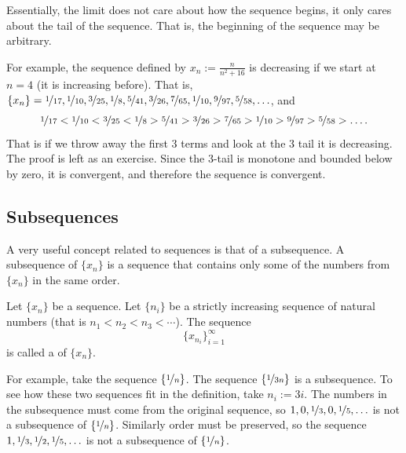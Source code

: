 \documentclass[12pt]{book}
\begin{document}
Essentially, the limit does not care about how the sequence begins, it only
cares about the tail of the sequence.
That is, the beginning of the sequence
may be arbitrary.

For example, the sequence defined by $x_n := \frac{n}{n^2+16}$ is decreasing
if we start at $n=4$ (it is increasing before).
That is,
$\{ x_n \} =
\nicefrac{1}{17},
\nicefrac{1}{10},
\nicefrac{3}{25},
\nicefrac{1}{8},
\nicefrac{5}{41},
\nicefrac{3}{26},
\nicefrac{7}{65},
\nicefrac{1}{10},
\nicefrac{9}{97},
\nicefrac{5}{58},\ldots$, and 
\begin{equation*}
\nicefrac{1}{17} <
\nicefrac{1}{10} <
\nicefrac{3}{25} <
\nicefrac{1}{8} >
\nicefrac{5}{41} >
\nicefrac{3}{26} >
\nicefrac{7}{65} >
\nicefrac{1}{10} >
\nicefrac{9}{97} >
\nicefrac{5}{58} > \ldots .
\end{equation*}
That is if we throw away the first 3 terms
and look at the 3 tail it is decreasing.
The proof is left as an exercise.
Since the 3-tail
is monotone and bounded below by zero, it is convergent, and therefore the sequence is convergent.

\subsection*{Subsequences}

A very useful concept related to sequences is that of a subsequence.
A subsequence of $\{ x_n \}$ is a sequence that contains
only some of the numbers from $\{ x_n \}$ in the same order.

\begin{defn}
Let $\{ x_n \}$ be a sequence.
Let $\{ n_i \}$ be a strictly increasing sequence of natural
numbers (that is $n_1 < n_2 < n_3 < \cdots$).  
The sequence
\begin{equation*}
\{ x_{n_i} \}_{i=1}^\infty
\end{equation*}
is called 
a \emph{} of $\{ x_n \}$.
\end{defn}

For example, take the sequence $\{ \nicefrac{1}{n} \}$.
The sequence
$\{ \nicefrac{1}{3n} \}$ is a subsequence.
To see how these two
sequences fit in the definition, take $n_i := 3i$.  
The numbers in the
subsequence must come from the original sequence, so $1,0,\nicefrac{1}{3},0,
\nicefrac{1}{5},\ldots$
is not a subsequence of $\{ \nicefrac{1}{n} \}$.
Similarly order
must be preserved, so
the sequence $1,\nicefrac{1}{3},\nicefrac{1}{2},\nicefrac{1}{5},\ldots$
is not a subsequence of $\{ \nicefrac{1}{n} \}$.
\end{document}
